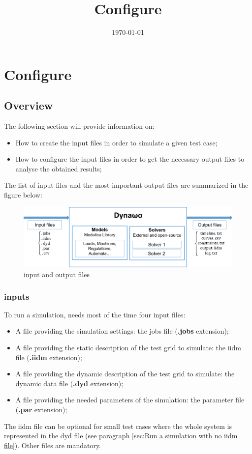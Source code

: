 \documentclass[a4paper, 12pt]{report}
\begin{document}
\title{Configure \Dynawo}
\date\today

\maketitle
\tableofcontents

\chapter[Configure Dynawo]{Configure \Dynawo}

\section{Overview}

The following section will provide information on:
\begin{itemize}
\item How to create the input files in order to simulate a given test case;
\item How to configure the input files in order to get the  necessary output files to analyse the obtained results;
\end{itemize}

The list of input files and the most important output files are summarized in the figure below:

\begin{figure}[h!]
\centering
\includegraphics[width=\textwidth]{../resources/DynawoModelSolver.png}
\caption{\Dynawo input and output files}
\end{figure}

\subsection[Dynawo inputs]{\Dynawo inputs}

To run a simulation, \Dynawo needs most of the time four input files:
\begin{itemize}
\item A file providing the simulation settings: the jobs file (\textbf{.jobs} extension);
\item A file providing the static description of the test grid to simulate: the iidm file (\textbf{.iidm} extension);
\item A file providing the dynamic description of the test grid to simulate: the dynamic data file (\textbf{.dyd} extension);
\item A file providing the needed parameters of the simulation: the parameter file (\textbf{.par} extension);
\end{itemize}
The iidm file can be optional for small test cases where the whole system is represented in the dyd file (see paragraph \ref{sec:Run a simulation with no iidm file}).
Other files are mandatory. \\
\end{document}
